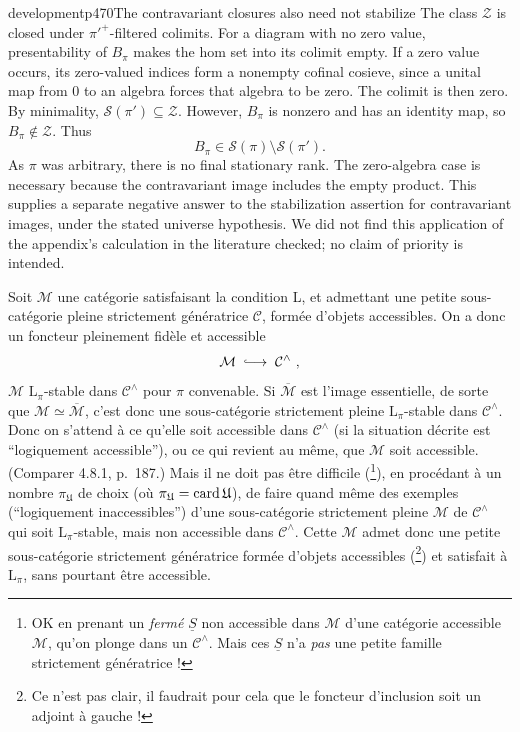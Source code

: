 \begin{dcomment}{development}{p470}{The contravariant closures also need not stabilize}
The class $\mathcal Z$ is closed under $\pi'^+$-filtered colimits. For a diagram with no zero value, presentability of $B_\pi$ makes the hom set into its colimit empty. If a zero value occurs, its zero-valued indices form a nonempty cofinal cosieve, since a unital map from $0$ to an algebra forces that algebra to be zero. The colimit is then zero. By minimality, $\mathcal S(\pi')\subseteq\mathcal Z$. However, $B_\pi$ is nonzero and has an identity map, so $B_\pi\notin\mathcal Z$. Thus
\[
 B_\pi\in\mathcal S(\pi)\setminus\mathcal S(\pi').
\]
As $\pi$ was arbitrary, there is no final stationary rank. The zero-algebra case is necessary because the contravariant image includes the empty product. This supplies a separate negative answer to the stabilization assertion for contravariant images, under the stated universe hypothesis. We did not find this application of the appendix's calculation in the literature checked; no claim of priority is intended.
\end{dcomment}


Soit $\mathcal{M}$ une catégorie satisfaisant la condition L, et admettant une petite sous-catégorie pleine strictement génératrice $\mathcal{C}$, formée d'objets accessibles. On a donc un foncteur pleinement fidèle et accessible
\[
\mathcal{M} \;\into\; \mathcal{C}^\wedge\ ,
\]
$\mathcal{M}$ $\mathrm{L}_\pi$-stable dans $\mathcal{C}^\wedge$ pour $\pi$ convenable. Si $\overline{\mathcal{M}}$ est l'image essentielle, de sorte que $\mathcal{M} \simeq \overline{\mathcal{M}}$, c'est donc une sous-catégorie strictement pleine $\mathrm{L}_\pi$-stable dans $\mathcal{C}^\wedge$. Donc on s'attend à ce qu'elle soit accessible dans $\mathcal{C}^\wedge$ (si la situation décrite est “logiquement accessible”), ou ce qui revient au même, que $\mathcal{M}$ soit accessible. (Comparer 4.8.1, p.~187.) Mais il ne doit pas être difficile (\footnote[192]{OK en prenant un \textit{fermé} $\underline{S}$ non accessible dans $\mathcal{M}$ d'une catégorie accessible $\mathcal{M}$, qu'on plonge dans un $\mathcal{C}^\wedge$. Mais ces $\underline{S}$ n'a \textit{pas} une petite famille strictement génératrice ! %
}), en procédant à un nombre $\pi_{\mathfrak{U}}$ de choix (où $\pi_{\mathfrak{U}} = \operatorname{card}\mathfrak{U}$), de faire quand même des exemples (“logiquement inaccessibles”) d'une sous-catégorie strictement pleine $\mathcal{M}$ de $\mathcal{C}^\wedge$ qui soit $\mathrm{L}_\pi$-stable, mais non accessible dans $\mathcal{C}^\wedge$. Cette $\mathcal{M}$ admet donc une petite sous-catégorie strictement génératrice formée d'objets accessibles (\footnote[193]{Ce n'est pas clair, il faudrait pour cela que le foncteur d'inclusion soit un adjoint à gauche !}) et satisfait à $\mathrm{L}_\pi$, sans pourtant être accessible.

